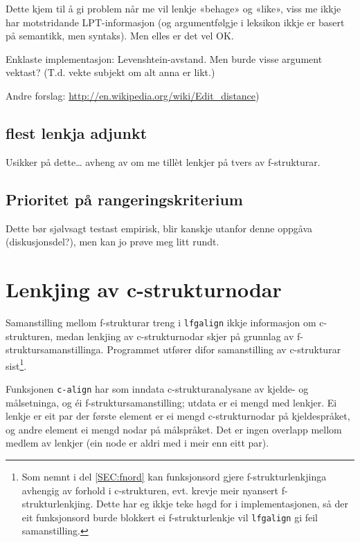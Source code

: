 \documentclass[11pt,a4paper,oneside,draft]{book}
\begin{document}
    Dette kjem til å gi problem når me vil lenkje «behage» og «like»,
    viss me ikkje har motstridande LPT-informasjon (og argumentfølgje
    i leksikon ikkje er basert på semantikk, men syntaks). Men elles
    er det vel OK.

    Enklaste implementasjon: Levenshtein-avstand. Men burde visse
    argument vektast? (T.d. vekte subjekt om alt anna er likt.)

    Andre forslag: \href{http://en.wikipedia.org/wiki/Edit_distance}{http://en.wikipedia.org/wiki/Edit\_distance})
\subsection{flest lenkja adjunkt}
\label{sec-4.2.4}

    Usikker på dette\ldots{} avheng av om me tillèt lenkjer på tvers av
    f-strukturar.
\subsection{Prioritet på rangeringskriterium}
\label{sec-4.2.5}

    Dette bør sjølvsagt testast empirisk, blir kanskje utanfor denne
    oppgåva (diskusjonsdel?), men kan jo prøve meg litt rundt.
\section{Lenkjing av c-strukturnodar}
\label{sec-4.3}

Samanstilling mellom f-strukturar treng i \texttt{lfgalign} ikkje informasjon
om c-strukturen, medan lenkjing av c-strukturnodar skjer på grunnlag
av f-struktursamanstillinga. Programmet utfører difor samanstilling av
c-strukturar sist\footnote{Som nemnt i del \ref{SEC:fnord} kan funksjonsord gjere
       f-strukturlenkjinga avhengig av forhold i c-strukturen,
       evt. krevje meir nyansert f-strukturlenkjing. Dette har eg
       ikkje teke høgd for i implementasjonen, så der eit funksjonsord
       burde blokkert ei f-strukturlenkje vil \texttt{lfgalign} gi feil
       samanstilling. }.

Funksjonen \texttt{c-align} har som inndata c-strukturanalysane av kjelde- og
målsetninga, og éi f-struktursamanstilling; utdata er ei mengd med
lenkjer. Ei lenkje er eit par der første element er ei mengd
c-strukturnodar på kjeldespråket, og andre element ei mengd nodar på
målspråket. Det er ingen overlapp mellom medlem av lenkjer (ein node
er aldri med i meir enn eitt par).
\end{document}
